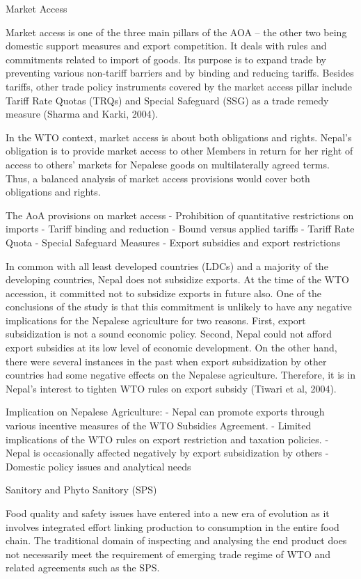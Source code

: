 \documentclass[
]{book}
\begin{document}
Market Access

Market access is one of the three main pillars of the AOA -- the other two being domestic support measures and export competition. It deals with rules and commitments related to import of goods. Its purpose is to expand trade by preventing various non-tariff barriers and by binding and reducing tariffs. Besides tariffs, other trade policy instruments covered by the market access pillar include Tariff Rate Quotas (TRQs) and Special Safeguard (SSG) as a trade remedy measure (Sharma and Karki, 2004).

In the WTO context, market access is about both obligations and rights. Nepal's obligation is to provide market access to other Members in return for her right of access to others' markets for Nepalese goods on multilaterally agreed terms. Thus, a balanced analysis of market access provisions would cover both obligations and rights.

The AoA provisions on market access
- Prohibition of quantitative restrictions on imports
- Tariff binding and reduction
- Bound versus applied tariffs
- Tariff Rate Quota
- Special Safeguard Measures
- Export subsidies and export restrictions

In common with all least developed countries (LDCs) and a majority of the developing countries, Nepal does not subsidize exports. At the time of the WTO accession, it committed not to subsidize exports in future also. One of the conclusions of the study is that this commitment is unlikely to have any negative implications for the Nepalese agriculture for two reasons. First, export subsidization is not a sound economic policy. Second, Nepal could not afford export subsidies at its low level of economic development. On the other hand, there were several instances in the past when export subsidization by other countries had some negative effects on the Nepalese agriculture. Therefore, it is in Nepal's interest to tighten WTO rules on export subsidy (Tiwari et al, 2004).

Implication on Nepalese Agriculture:
- Nepal can promote exports through various incentive measures of the WTO Subsidies Agreement.
- Limited implications of the WTO rules on export restriction and taxation policies.
- Nepal is occasionally affected negatively by export subsidization by others
- Domestic policy issues and analytical needs

Sanitory and Phyto Sanitory (SPS)

Food quality and safety issues have entered into a new era of evolution as it involves integrated effort linking production to consumption in the entire food chain. The traditional domain of inspecting and analysing the end product does not necessarily meet the requirement of emerging trade regime of WTO and related agreements such as the SPS.
\end{document}

